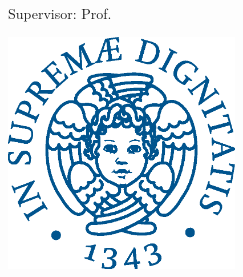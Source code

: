 \begin{titlepage}
    \begin{addmargin}[-1cm]{-3cm}
    \begin{center}
        \large

        \hfill

        \vfill

        \begingroup
            \color{CTtitle}\spacedallcaps{\myTitle} \\ \medskip
        \endgroup
        \mySubtitle \\ \bigskip

        \spacedlowsmallcaps{\myName} \\
        Supervisor: Prof. \mySupervisor

        \vfill

        \includegraphics[width=6cm]{gfx/cherubino_pant541.eps} \\ \medskip

        \myDepartment \\
        \myUni \\ \bigskip

        \myTime\

        \vfill

    \end{center}
  \end{addmargin}
\end{titlepage}
